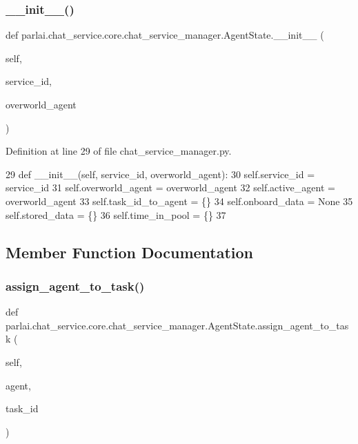 \subsubsection{\texorpdfstring{\+\_\+\+\_\+init\+\_\+\+\_\+()}{\_\_init\_\_()}}
{\footnotesize\ttfamily def parlai.\+chat\+\_\+service.\+core.\+chat\+\_\+service\+\_\+manager.\+Agent\+State.\+\_\+\+\_\+init\+\_\+\+\_\+ (\begin{DoxyParamCaption}\item[{}]{self,  }\item[{}]{service\+\_\+id,  }\item[{}]{overworld\+\_\+agent }\end{DoxyParamCaption})}



Definition at line 29 of file chat\+\_\+service\+\_\+manager.\+py.


\begin{DoxyCode}
29     \textcolor{keyword}{def }\_\_init\_\_(self, service\_id, overworld\_agent):
30         self.service\_id = service\_id
31         self.overworld\_agent = overworld\_agent
32         self.active\_agent = overworld\_agent
33         self.task\_id\_to\_agent = \{\}
34         self.onboard\_data = \textcolor{keywordtype}{None}
35         self.stored\_data = \{\}
36         self.time\_in\_pool = \{\}
37 
\end{DoxyCode}


\subsection{Member Function Documentation}
\mbox{\label{classparlai_1_1chat__service_1_1core_1_1chat__service__manager_1_1AgentState_acd466dee9263f15df73ae187a64f0741}} 
\subsubsection{\texorpdfstring{assign\+\_\+agent\+\_\+to\+\_\+task()}{assign\_agent\_to\_task()}}
{\footnotesize\ttfamily def parlai.\+chat\+\_\+service.\+core.\+chat\+\_\+service\+\_\+manager.\+Agent\+State.\+assign\+\_\+agent\+\_\+to\+\_\+task (\begin{DoxyParamCaption}\item[{}]{self,  }\item[{}]{agent,  }\item[{}]{task\+\_\+id }\end{DoxyParamCaption})}

